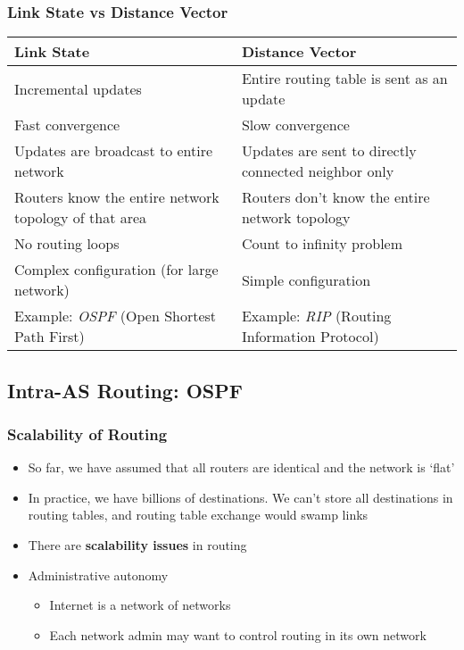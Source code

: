 \subsubsection{Link State vs Distance Vector}
\begin{center}
	\begin{tabular}{l|l}
		\textbf{Link State} & \textbf{Distance Vector} \\ \hline
		Incremental updates & Entire routing table is sent as an update \\
		Fast convergence & Slow convergence \\
		Updates are broadcast to entire network & Updates are sent to directly connected neighbor only \\
		Routers know the entire network topology of that area & Routers don't know the entire network topology\\
		No routing loops & Count to infinity problem\\
		Complex configuration (for large network) & Simple configuration \\
		Example: \textit{OSPF} (Open Shortest Path First) & Example: \textit{RIP} (Routing Information Protocol)
	\end{tabular}
\end{center}

\subsection{Intra-AS Routing: OSPF}
\subsubsection{Scalability of Routing}
\begin{itemize}
	\item So far, we have assumed that all routers are identical and the network is `flat'
	\item In practice, we have billions of destinations. We can't store all destinations in routing tables, and routing table exchange would swamp links
	\item There are \textbf{scalability issues} in routing
	\item Administrative autonomy
	\begin{itemize}
		\item Internet is a network of networks
		\item Each network admin may want to control routing in its own network
	\end{itemize}
\end{itemize}

